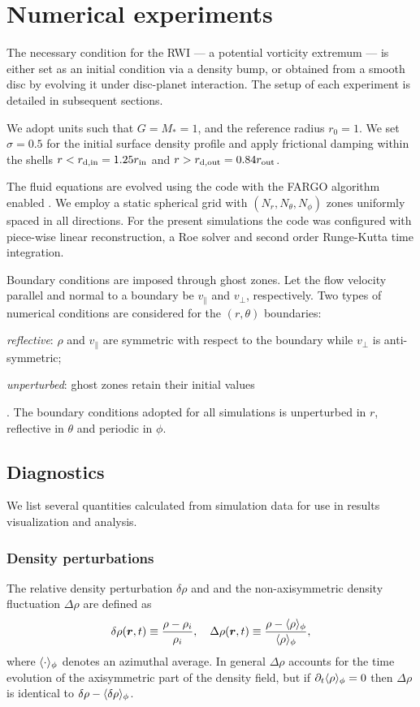 \section{Numerical experiments}\label{sims}
The necessary condition for the RWI --- a potential vorticity 
extremum \citep{li00} --- is either set as an initial condition
via a density bump, or obtained from a smooth disc by evolving it
under disc-planet interaction. The setup of each experiment is
detailed in subsequent sections.    

We adopt units such that $G=M_*=1$, and the reference radius $r_0=1$.    
We set $\sigma=0.5$ for the initial surface density profile and apply 
frictional damping within the shells $r<r_\mathrm{d,in} = 1.25r_\mathrm{in}$
and $r>r_\mathrm{d,out}=0.84r_\mathrm{out}$.

The fluid equations are evolved using the \pluto code \citep{mignone07} with 
the FARGO algorithm enabled \citep{mignone12}. We employ a static
spherical grid with $(N_r, N_\theta, N_\phi)$ zones uniformly spaced
in all directions. For the present simulations the code was configured
with piece-wise linear reconstruction, a Roe solver and second order
Runge-Kutta time integration.   

Boundary conditions are imposed through ghost zones.   
Let the flow velocity parallel and normal to a boundary be
$v_\parallel$ and $v_\perp$, respectively. Two types of numerical 
conditions are considered for the $(r,\theta)$ boundaries:
\begin{inparaenum}[(a)]
\item \emph{reflective}: $\rho$ and $v_\parallel$ are symmetric with
  respect to the boundary while $v_\perp$ is anti-symmetric;  
\item \emph{unperturbed}: ghost zones retain their initial values
\end{inparaenum}. 
The boundary conditions adopted for all simulations is unperturbed in
$r$, reflective in $\theta$ and periodic in $\phi$. 


\subsection{Diagnostics}
We list several quantities calculated from simulation data for use in
results visualization and analysis.  
 
\subsubsection{Density perturbations}
The relative density perturbation $\delta\rho$ and 
and the non-axisymmetric density fluctuation $\Delta\rho$ are defined as 
\begin{align}
  \delta\rho(\bm{r},t) \equiv \frac{\rho - \rho_i}{\rho_i}, \quad
  \Delta\rho(\bm{r},t) \equiv \frac{\rho -
    \langle \rho \rangle_\phi}{\langle \rho \rangle_\phi}, 
\end{align} 
where $\langle \cdot \rangle_\phi$ denotes an azimuthal average.  
In general $\Delta\rho$ accounts for the time evolution of 
the axisymmetric part of the density field, but if
$\partial_t\langle \rho \rangle_\phi=0$ then $\Delta\rho$ is identical to
$\delta\rho-\langle \delta\rho \rangle_\phi$.    


